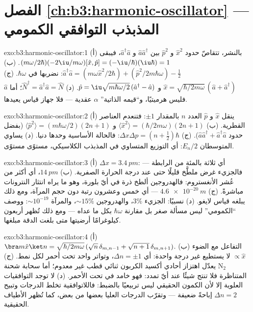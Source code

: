 \section*{الفصل \ref{ch:b3:harmonic-oscillator} --- المذبذب التوافقي الكمومي}

\begin{solution}{exo:b3:harmonic-oscillator:1}
(أ) بالنشر، تتقاصّ حدود $\hat x^2$ و $\hat p^2$ بين
$\hat a\hat a^\dagger$ و $\hat a^\dagger\hat a$، فيبقى
$(m\omega/2\hbar)(-2\iu/m\omega)[\hat x, \hat p] =
(-\iu/\hbar)(\iu\hbar) = 1$. (ب) $\hat a^\dagger\hat a = (m\omega\hat x^2/2\hbar) +
(\hat p^2/2m\hbar\omega) - \tfrac12$: نضربها في $\hbar\omega$. (ج)
$\hat x = \sqrt{\hbar/2m\omega}\,(\hat a + \hat a^\dagger)$ و $\hat p
= \iu\sqrt{m\hbar\omega/2}\,(\hat a^\dagger - \hat a)$. (د) $\hat
N^\dagger = \hat a^\dagger\hat a = \hat N$؛ أما $\hat a$ فليس
هرميتيًا، و``قيمه الذاتية'' $\alpha$ عقدية --- فلا
جهاز قياس يعيدها.
\end{solution}

\begin{solution}{exo:b3:harmonic-oscillator:2}
(أ) ينقل $\hat x$ و $\hat p$ العدد $n$ بالمقدار $\pm1$: فتنعدم العناصر
القطرية. (ب) $\langle\hat x^2\rangle = (\hbar/2m\omega)(2n + 1)$ و
$\langle\hat p^2\rangle = (m\hbar\omega/2)(2n + 1)$ (بفضل حدود $\hat
a\hat a^\dagger + \hat a^\dagger\hat a$). (ج) $\Delta x\Delta p
= (n + \tfrac12)\hbar$: فالحالة الأساسية وحدها دنيا. (د) يساوي
المتوسطان $E_n/2$: أي التوزيع المتساوي في المذبذب الكلاسيكي،
مستوًى مستوًى.
\end{solution}

\begin{solution}{exo:b3:harmonic-oscillator:3}
(أ) $\Delta x = \qty{3.4}{pm}$: أي ثلاثة بالمئة من الرابطة --- فالجزيء
غرض ملطَّخ قليلًا حتى عند درجة الحرارة الصفرية. (ب)
$\qty{14}{pm}$، أي أكثر من عُشر الأنغستروم: فالهدروجين ألطخ ذرة في أيّ
بلورة، وهو ما يراه انتثار النترونات مباشرةً. (ج) $\qty{4.6e-20}{m}$
--- أي خمس وعشرون رتبة دون حجم المرآة، ومع ذلك يبلغه قياس
لايغو. (د) نسبيًا: الجزيء $3\%$، والهدروجين $\sim15\%$،
والمرآة $\sim10^{-19}$: ووصف ``الكمومي'' ليس مسألة صغر بل مقارنة $\hbar\omega$
بكل ما عداه --- ومع ذلك تُظهر أربعون كيلوغرامًا أرضيتها
متى بلغت الدقة مبلغها.
\end{solution}

\begin{solution}{exo:b3:harmonic-oscillator:4}
(أ) $\bra m\hat x\ket n = \sqrt{\hbar/2m\omega}\,(\sqrt n\,
\delta_{m,n-1} + \sqrt{n + 1}\,\delta_{m,n+1})$. (ب) التفاعل
مع الضوء $\propto\hat x$ لا يستطيع غير درجة واحدة: أي $\Delta n =
\pm1$، وتواتر واحد تحت أحمر لكل نمط. (ج) يعدّل اهتزاز أحادي أكسيد الكربون
ثنائي قطب غير معدوم؛ أما سحابة شحنة N$_2$ المتناظرة فلا تنتج شيئًا
عند أيّ تمدد: فهو خامد في تحت الأحمر. (د) لا توجد التوافقيات العلوية إلا لأن
الكمون الحقيقي ليس تربيعيًا بالضبط: فاللاتوافقية تخلط الدرجات
وتبيح $\Delta n = 2$ إباحةً ضعيفة --- وتقرّب الدرجات العليا
بعضها من بعض، كما تُظهر الأطياف الحقيقية.
\end{solution}

